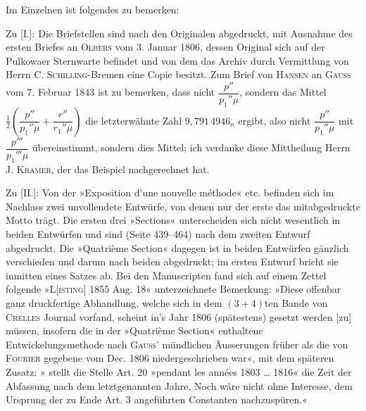 \clearpage
\begingroup
{}
\renewcommand{\headrulewidth}{0pt}
\par\noindent\hspace*{\parindent}Im Einzelnen ist folgendes zu bemerken:

\par\noindent\hspace*{\parindent}Zu [I.]: Die Briefstellen sind nach den Originalen abgedruckt,
mit Ausnahme des ersten Briefes an \textsc{Olbers} vom 3. Januar 1806,
dessen Original sich auf der Pulkowaer Sternwarte befindet und von dem das
Archiv durch Vermittlung von Herrn C. \textsc{Schilling}-Bremen eine Copie besitzt.
Zum Brief von \textsc{Hansen} an \textsc{Gauss} vom 7. Februar 1843 ist zu bemerken,
dass nicht \(\dfrac{p''}{p_1''\mu}\), sondern das Mittel
\(\frac12\left(\dfrac{p''}{p_1''\mu}+\dfrac{r''}{r_1''\mu}\right)\)
die letzterwähnte Zahl \(9{,}791\,4946_n\) ergibt, also nicht
\(\dfrac{p''}{p_1''\mu}\) mit \(\dfrac{p'''}{p_1'''\mu}\) übereinstimmt,
sondern dies Mittel; ich verdanke diese Mittheilung Herrn J. \textsc{Kramer},
der das Beispiel nachgerechnet hat.

\par\noindent\hspace*{\parindent}Zu [II.]: Von der »Exposition d'une nouvelle méthode« etc.
befinden sich im Nachlass zwei unvollendete Entwürfe, von denen nur der erste
das mitabgedruckte Motto trägt. Die ersten drei »Sections« unterscheiden sich
nicht wesentlich in beiden Entwürfen und sind (Seite 439--464) nach dem zweiten
Entwurf abgedruckt. Die »Quatrième Section« dagegen ist in beiden Entwürfen
gänzlich verschieden und darum nach beiden abgedruckt; im ersten Entwurf bricht
sie inmitten eines Satzes ab. Bei den Manuscripten fand sich auf einem Zettel
folgende »L[\textsc{isting}] 1855 Aug. 18« unterzeichnete Bemerkung:
»Diese offenbar ganz druckfertige Abhandlung, welche sich in dem \((3+4)\)ten Bande
von \textsc{Crelles} Journal vorfand, scheint in's Jahr 1806 (spätestens) gesetzt
werden [zu] müssen, insofern die in der »Quatrième Section« enthaltene
Entwickelungsmethode nach \textsc{Gauss}' mündlichen Äusserungen früher als die von
\textsc{Fourier} gegebene vom Dec. 1806 niedergeschrieben war«, mit dem späteren Zusatz:
» stellt die Stelle Art. 20 »pendant les années 1803 \ldots{} 1816«
die Zeit der Abfassung nach dem letztgenannten Jahre. Noch wäre nicht ohne Interesse,
dem Ursprung der zu Ende Art. 3 angeführten Constanten nachzuspüren.«

